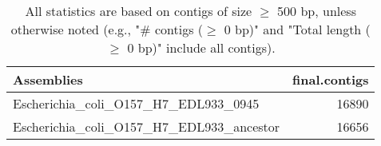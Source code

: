 \documentclass[12pt,a4paper]{article}
\begin{document}
\begin{table}[ht]
\begin{center}
\caption{All statistics are based on contigs of size $\geq$ 500 bp, unless otherwise noted (e.g., "\# contigs ($\geq$ 0 bp)" and "Total length ($\geq$ 0 bp)" include all contigs).}
\begin{tabular}{|l*{1}{|r}|}
\hline
Assemblies & final.contigs \\ \hline
Escherichia\_coli\_O157\_H7\_EDL933\_0945 & 16890 \\ \hline
Escherichia\_coli\_O157\_H7\_EDL933\_ancestor & 16656 \\ \hline
\end{tabular}
\end{center}
\end{table}
\end{document}
